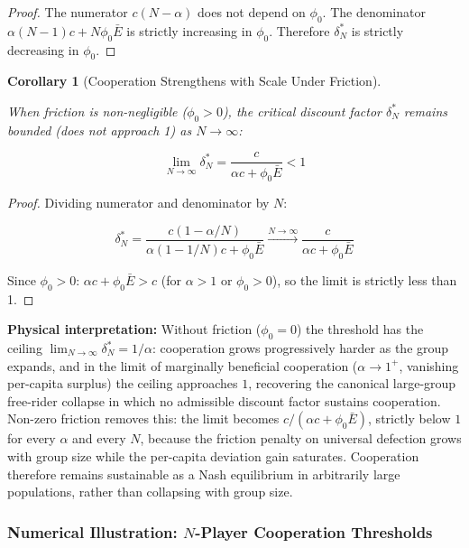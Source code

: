 \documentclass[11pt]{article}
\theoremstyle{plain}
\newtheorem{corollary}[theorem]{Corollary}
\theoremstyle{definition}
\theoremstyle{remark}
\let\origsubsubsection\subsubsection
\renewcommand{\subsubsection}{\needspace{4\baselineskip}\origsubsubsection}
\begin{document}
\begin{proof}
The numerator $c(N - \alpha)$ does not depend on $\phi_0$. The denominator $\alpha(N-1)c + N\phi_0\bar{E}$ is strictly increasing in $\phi_0$. Therefore $\delta_N^*$ is strictly decreasing in $\phi_0$.
\end{proof}

\begin{corollary}[Cooperation Strengthens with Scale Under Friction]
\label{cor-cooperation-strengthens-scale}

When friction is non-negligible ($\phi_0 > 0$), the critical discount factor $\delta_N^*$ remains bounded (does not approach 1) as $N \to \infty$:

$$\lim_{N \to \infty} \delta_N^* = \frac{c}{\alpha c + \phi_0 \bar{E}} < 1$$
\end{corollary}

\begin{proof}
Dividing numerator and denominator by $N$:

$$\delta_N^* = \frac{c(1 - \alpha/N)}{\alpha(1 - 1/N)c + \phi_0\bar{E}} \xrightarrow{N \to \infty} \frac{c}{\alpha c + \phi_0\bar{E}}$$

Since $\phi_0 > 0$: $\alpha c + \phi_0\bar{E} > c$ (for $\alpha > 1$ or $\phi_0 > 0$), so the limit is strictly less than 1.
\end{proof}

\textbf{Physical interpretation:} Without friction (\(\phi_0 = 0\)) the
threshold has the ceiling \(\lim_{N \to \infty} \delta_N^* = 1/\alpha\):
cooperation grows progressively harder as the group expands, and in the
limit of marginally beneficial cooperation (\(\alpha \to 1^+\),
vanishing per-capita surplus) the ceiling approaches \(1\), recovering
the canonical large-group free-rider collapse in which no admissible
discount factor sustains cooperation. Non-zero friction removes this:
the limit becomes \(c/(\alpha c + \phi_0 \bar{E})\), strictly below
\(1\) for every \(\alpha\) and every \(N\), because the friction penalty
on universal defection grows with group size while the per-capita
deviation gain saturates. Cooperation therefore remains sustainable as a
Nash equilibrium in arbitrarily large populations, rather than
collapsing with group size.

\subsubsection{\texorpdfstring{Numerical Illustration: \(N\)-Player
Cooperation
Thresholds}{Numerical Illustration: N-Player Cooperation Thresholds}}\label{n-player-cooperation-thresholds}
\end{document}
